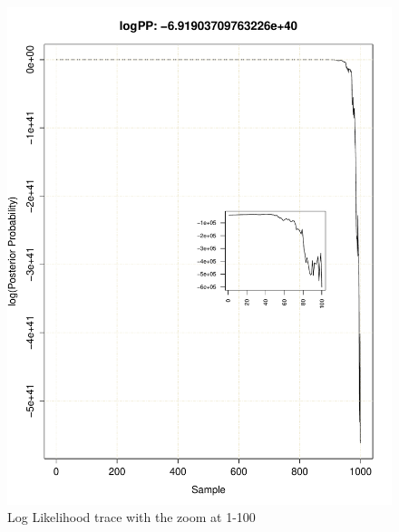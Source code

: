 \documentclass[11pt]{labbook}
\begin{document}
    \begin{figure}
        \centering
        \includegraphics[scale=.75]{FONSE_Plots/2016/June_29/LogLikeTrace_1-100}
        \caption{Log Likelihood trace with the zoom at 1-100}
        \label{fig:JUN29_1-100}
    \end{figure}
\end{document}
